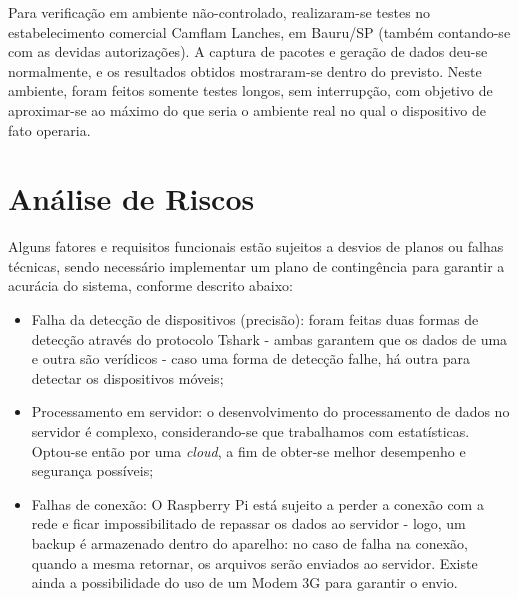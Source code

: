 Para verificação em ambiente não-controlado, realizaram-se testes no estabelecimento comercial Camflam Lanches, em Bauru/SP (também contando-se com as devidas autorizações). A captura de pacotes e geração de dados deu-se normalmente, e os resultados obtidos mostraram-se dentro do previsto. Neste ambiente, foram feitos somente testes longos, sem interrupção, com objetivo de aproximar-se ao máximo do que seria o ambiente real no qual o dispositivo de fato operaria.

\section{Análise de Riscos}
Alguns fatores e requisitos funcionais estão sujeitos a desvios de planos ou falhas técnicas, sendo necessário implementar um plano de contingência para garantir a acurácia do sistema, conforme descrito abaixo:

\begin{itemize}
  \item Falha da detecção de dispositivos (precisão): foram feitas duas formas de detecção através do protocolo Tshark - ambas garantem que os dados de uma e outra são verídicos - caso uma forma de detecção falhe, há outra para detectar os dispositivos móveis;
  \item Processamento em servidor: o desenvolvimento do processamento de dados no servidor é complexo, considerando-se que trabalhamos com estatísticas. Optou-se então por uma \emph{cloud}, a fim de obter-se melhor desempenho e segurança possíveis;
  \item Falhas de conexão: O Raspberry Pi está sujeito a perder a conexão com a rede e ficar impossibilitado de repassar os dados ao servidor - logo, um backup é armazenado dentro do aparelho: no caso de falha na conexão, quando a mesma retornar, os arquivos serão enviados ao servidor. Existe ainda a possibilidade do uso de um Modem 3G para garantir o envio.
\end{itemize}
